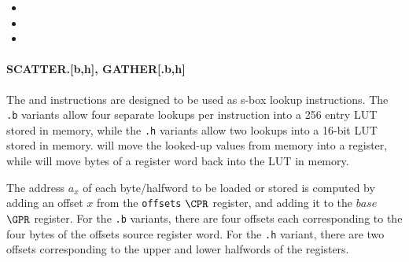\begin{itemize}
\item {}
\item {}
\item {}
\end{itemize}


\paragraph{SCATTER.[b,h], GATHER[.b,h]}

The  and  instructions are designed to be used as
s-box lookup instructions. The {\tt .b} variants allow four separate lookups
per instruction into a 256 entry LUT stored in memory, while the {\tt .h}
variants allow two lookups into a 16-bit LUT stored in memory. 
will move the looked-up values from memory into a register, while 
will move bytes of a register word back into the LUT in memory.

The address $a_x$ of each byte/halfword to be loaded or stored is computed by
adding an offset $x$ from the {\tt offsets} $\CPR$ register, and adding it
to the $base$ $\GPR$ register. For the {\tt .b} variants, there are four
offsets each corresponding to the four bytes of the offsets source register
word. For the {\tt .h} variant, there are two offsets corresponding to the
upper and lower halfwords of the registers.

